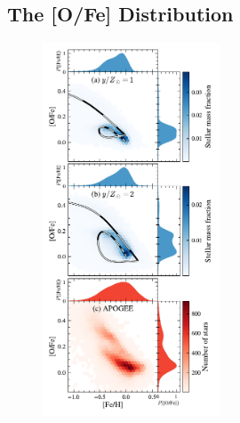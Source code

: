 \documentclass[twocolumn,twocolappendix,linenumbers]{aastex631}
\newcommand{\onecolumn}{0.47\textwidth}
\begin{document}
\subsection{The [O/Fe] Distribution}
\label{sec:abundance-distributions}

\begin{figure}
    \centering
    \includegraphics[width=\onecolumn]{figures/ofe_feh_density.pdf}

\end{figure}
\end{document}
